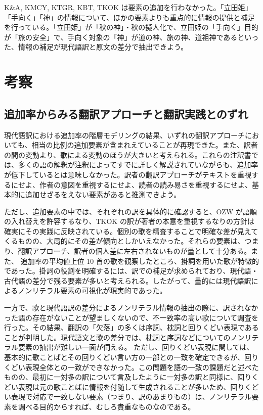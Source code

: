 \documentclass[
  letterpaper,
  DIV=11,
  numbers=noendperiod]{scrartcl}
\begin{document}
K\&A, KMCY, KTGR, KBT, TKOK
は要素の追加を行わなかった。「立田姫」「手向く」「神」の情報について、ほかの要素よりも重点的に情報の提供と補足を行っている。「立田姫」が「秋の神」・秋の擬人化で、立田姫の「手向く」目的が「旅の安全」で、手向く対象の「神」が道の神、旅の神、道祖神であるといった、情報の補足が現代語訳と原文の差分で抽出できよう。

\section{考察}\label{sec-discussion}

\subsection{追加率からみる翻訳アプローチと翻訳実践とのずれ}\label{ux8ffdux52a0ux7387ux304bux3089ux307fux308bux7ffbux8a33ux30a2ux30d7ux30edux30fcux30c1ux3068ux7ffbux8a33ux5b9fux8df5ux3068ux306eux305aux308c}

現代語訳における追加率の階層モデリングの結果、いずれの翻訳アプローチにおいても、相当の比例の追加要素が含まれえていることが再現できた。また、訳者の間の変動より、歌による変動のほうが大きいと考えられる。これらの注釈書では、多くの語の解釈が注釈によってすでに詳しく解説されていながらも、追加率が低下しているとは意味しなかった。訳者の翻訳アプローチがテキストを重視するにせよ、作者の意図を重視するにせよ、読者の読み易さを重視するにせよ、基本的に追加せざるをえない要素があると推測できよう。

ただし、追加要素の中では、それぞれの訳を具体的に確認すると、OZW
が語順の入れ替えを許容するなり、TKOK
の訳が著者の本意を重視するなりの方針は確実にその実践に反映されている。個別の歌を精査することで明確な差が見えてくるものの、大局的にその差が傾向としかいえなかった。それらの要素は、つまり、翻訳アプローチ、訳者の個人差に左右されないものが量として十分ある。また、
追加率の平均値上位 10
首の歌を観察したところ、掛詞を用いた歌が特徴的であった。掛詞の役割を明確するには、訳での補足が求められており、現代語・古代語の差分で残る要素が多いと考えられる。したがって、量的には現代語訳によるノンリテラル要素の可視化が現実的であった。

一方で、歌と現代語訳の差分によるノンリテラル情報の抽出の際に、訳されなかった語の存在がないことが望ましくないので、不一致率の高い歌について調査を行った。その結果、翻訳の「欠落」の多くは序詞、枕詞と回りくどい表現であることが判明した。現代語文と歌の差分では、枕詞と序詞などについてのノンリテラル要素の抽出が難しい一面が伺える。
ただし、回りくどい表現に関しては、基本的に歌ことばとその回りくどい言い方の一部との一致を確定できるが、回りくどい表現全体との一致ができなかった。この問題を語の一致の課題だと述べたものの、最初に一対多の訳について言及したように一対多の訳と同様に、回りくどい表現は元の歌ことばに情報を付随して生成されることが多いため、回りくどい表現で対応で一致しない要素（つまり、訳のあまりもの）は、ノンリテラル要素を調べる目的からすれば、むしろ貴重なものなのである。
\end{document}
